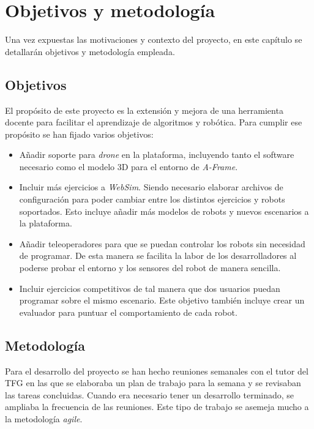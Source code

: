 \chapter{Objetivos y metodología}
Una vez expuestas las motivaciones y contexto del proyecto, en este capítulo se detallarán objetivos y metodología empleada. 

\label{chap:objetivos}
\section{Objetivos}
El propósito de este proyecto es la extensión y mejora de una herramienta docente para facilitar el aprendizaje de algoritmos y robótica. Para cumplir ese propósito se han fijado varios objetivos:
\begin{itemize}
    \item Añadir soporte para \textit{drone} en la plataforma, incluyendo tanto el software necesario como el modelo 3D para el entorno de \textit{A-Frame}.
    
    \item Incluir más ejercicios a \textit{WebSim}. Siendo necesario elaborar archivos de configuración para poder cambiar entre los distintos ejercicios y robots soportados. Esto incluye añadir más modelos de robots y nuevos escenarios a la plataforma.
    
    \item Añadir teleoperadores para que se puedan controlar los robots sin necesidad de programar. De esta manera se facilita la labor de los desarrolladores al poderse probar el entorno y los sensores del robot de manera sencilla.
    
    \item Incluir ejercicios competitivos de tal manera que dos usuarios puedan programar sobre el mismo escenario. Este objetivo también incluye crear un evaluador para puntuar el comportamiento de cada robot. 
    
\end{itemize}
\section{Metodología}
\label{sec:metodologia}

Para el desarrollo del proyecto se han hecho reuniones semanales con el tutor del TFG en las que se elaboraba un plan de trabajo para la semana y se revisaban las tareas concluidas. Cuando era necesario tener un desarrollo terminado, se ampliaba la frecuencia de las reuniones. Este tipo de trabajo se asemeja mucho a la metodología \textit{agile}. \newline

